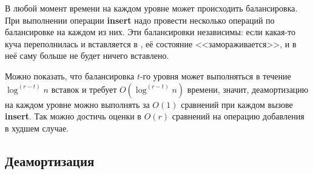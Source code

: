 В любой момент времени на каждом уровне может происходить балансировка. При выполнении
операции \textbf{insert} надо провести несколько операций по балансировке на каждом из них.
Эти балансировки независимы: если какая-то куча \MH[t] переполнилась и вставляется
в \MH[t+1], её состояние <<замораживается>>, и в неё саму больше не будет ничего вставлено.

Можно показать, что балансировка $t$-го уровня может выполняться в течение $\log^{(r-t)}n$
вставок и требует $O(\log^{(r-t)}n)$ времени, значит, деамортизацию на каждом уровне
можно выполнять за $O(1)$ сравнений при каждом вызове \textbf{insert}. Так можно
достичь оценки в $O(r)$ сравнений на операцию добавления в худшем случае.


\subsection{Деамортизация \CH[*]}
